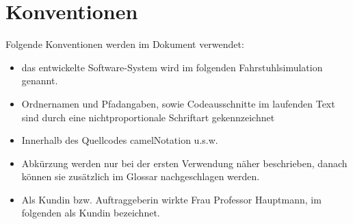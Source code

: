 \section*{Konventionen}
Folgende Konventionen werden im Dokument verwendet:\\
\begin{itemize}
	\item das entwickelte Software-System wird im folgenden Fahrstuhlsimulation genannt.
	\item Ordnernamen und Pfadangaben, sowie Codeausschnitte im laufenden Text sind durch eine nichtproportionale Schriftart gekennzeichnet
	\item Innerhalb des Quellcodes camelNotation u.s.w.
	\item Abkürzung werden nur bei der ersten Verwendung näher beschrieben, danach können sie zusätzlich im Glossar nachgeschlagen werden.
	\item Als Kundin bzw. Auftraggeberin wirkte Frau Professor Hauptmann, im folgenden als Kundin bezeichnet.
\end{itemize}
